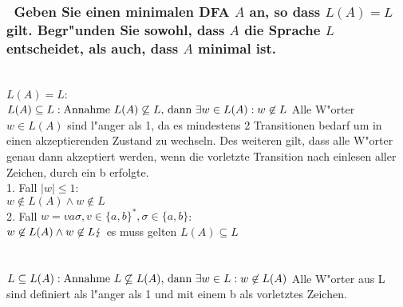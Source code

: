 \documentclass{article}
\newcommand{\gap}{\null\ \\ \\}
\renewcommand{\~}{\sim}
\begin{document}
\subsubsection{\
    Geben Sie einen minimalen DFA $A$ an, so dass $L(A) = L$ gilt. Begr"unden 
        Sie sowohl, dass $A$ die Sprache $L$ entscheidet, als auch, dass $A$ 
        minimal ist.
    }
\\
$L(A) = L$:\\$
\\
L(A) \subseteq L:\\
\text{Annahme } L(A) \not \subseteq L \text{, dann } 
    \exists w \in L(A) : w \not \in L\\
\\
$ Alle W"orter $w \in L(A)$ sind l"anger als 1, da es mindestens 2 Transitionen
    bedarf um in einen akzeptierenden Zustand zu wechseln. Des weiteren gilt,
    dass alle W"orter genau dann akzeptiert werden, wenn die vorletzte 
    Transition nach einlesen aller Zeichen, durch ein b erfolgte.\\
1. Fall $|w| \leq 1$:\\
$w \not \in L(A) \land w \not \in L$\\
2. Fall $w = va\sigma, v \in \{a,b\}^*, \sigma \in \{a,b\}$:\\
$w \not \in L(A) \land w \not \in L\\
\lightning$ es muss gelten $L(A) \subseteq L$\\
\gap
$L \subseteq L(A):\\
\text{Annahme } L \not \subseteq L(A) \text{, dann } 
    \exists w \in L : w \not \in L(A)\\
\\
$ Alle W"orter aus L sind definiert als l"anger als 1 und mit einem b als
    vorletztes Zeichen.\\
\end{document}
